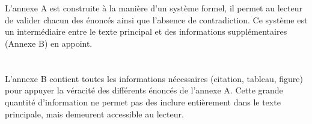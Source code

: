 \chapter[Annexe d'un système formel pour le chapitre 1]{}

L'annexe A est construite à la manière d'un système formel, il permet au lecteur de valider chacun des énoncés ainsi que l'absence de contradiction. Ce système est un intermédiaire entre le texte principal et des informations supplémentaires (Annexe B) en appoint. 





\renewcommand{\subsection}[1]{}
\renewcommand{\paragraphe}[4]{}
\renewcommand{\enonce}[5]{}
\renewcommand{\enoncewithoutexp}[5]{}
\renewcommand{\explication}[5]{
\typeout{SYSOUT_EXPLICATION: #1}%
\begin{theobloc}[Explication #2 #1 : #3]
\label{explication:#1}%
\leavevmode\\%
#4%
\ifthenelse{\equal{#5}{}}%
{\leavevmode\\\footnotesize{(voir énoncé p.\href{#1}{\pageref{enonce:#1})}}}%
{#5}%
\end{theobloc}%
}

\renewcommand{\figannexe}[1]{
#1
}

\chapter[Annexe des explications pour le chapitre 1]{}

L'annexe B contient toutes les informations nécessaires (citation, tableau, figure) pour appuyer la véracité des différents énoncés de l'annexe A. Cette grande quantité d'information ne permet pas des inclure entièrement dans le texte principale, mais demeurent accessible au lecteur. 



\chapter[Annexe pour décrire les langages utilisés]{}



\chapter[Annexe fournissant des exemples d'intrants et d'extrants]{}



